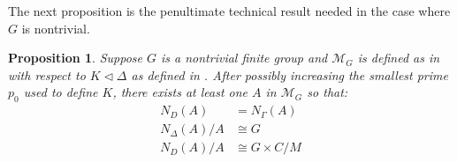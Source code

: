 \documentclass[11pt]{article}
\theoremstyle{plain}
\newtheorem{prop}[thm]{Proposition}
\theoremstyle{definition}
\theoremstyle{remark}
\newcommand{\calM}{\mathcal{M}}
\newcommand{\Gam}{\Gamma}
\newcommand{\Del}{\Delta}
\begin{document}
The next proposition is the penultimate technical result needed in the case where $G$ is nontrivial.

\begin{prop}\label{prop:FindA}
Suppose $G$ is a nontrivial finite group and $\calM_G$ is defined as in  with respect to $K \triangleleft \Del$ as defined in . After possibly increasing the smallest prime $p_0$ used to define $K$, there exists at least one $A$ in $\calM_G$ so that:
\begin{align}
N_D(A) &= N_\Gam(A) \label{eq:ND=NGam} \\
N_\Del(A) / A &\cong G \label{eq:NDel(A)/A=G} \\
N_D(A) / A &\cong G \times C / M \label{eq:ND(A)/A}
\end{align}
\end{prop}
\end{document}
